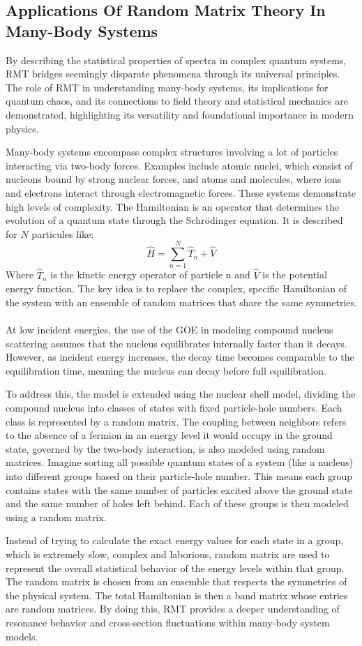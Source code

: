 \subsection{Applications Of Random Matrix Theory In Many-Body Systems}\label{subsec:applications-of-random-matrix-theory-in-many-body-systems}

By describing the statistical properties of spectra in complex quantum systems, RMT bridges seemingly disparate phenomena through its universal principles.
The role of RMT in understanding many-body systems, its implications for quantum chaos, and its connections to field theory and statistical mechanics are demonstrated, highlighting its versatility and foundational importance in modern physics.

Many-body systems encompass complex structures involving a lot of particles interacting via two-body forces.
Examples include atomic nuclei, which consist of nucleons bound by strong nuclear forces, and atoms and molecules, where ions and electrons interact through electromagnetic forces.
These systems demonstrate high levels of complexity.
The Hamiltonian is an operator that determines the evolution of a quantum state through the Schrödinger equation.
It is described for $N$ particules like:
\[\hat{H}=\sum^N_{n=1}\hat{T}_n+\hat{V}\]
Where $\hat{T}_n$ is the kinetic energy operator of particle n and $\hat{V}$ is the potential energy function.
The key idea is to replace the complex, specific Hamiltonian of the system with an ensemble of random matrices that share the same symmetries.
\\\\
At low incident energies, the use of the GOE in modeling compound nucleus scattering assumes that the nucleus equilibrates internally faster than it decays.
However, as incident energy increases, the decay time becomes comparable to the equilibration time, meaning the nucleus can decay before full equilibration.

\noindent To address this, the model is extended using the nuclear shell model, dividing the compound nucleus into classes of states with fixed particle-hole numbers.
Each class is represented by a random matrix.
The coupling between neighbors refers to the absence of a fermion in an energy level it would occupy in the ground state, governed by the two-body interaction, is also modeled using random matrices.
Imagine sorting all possible quantum states of a system (like a nucleus) into different groups based on their particle-hole number.
This means each group contains states with the same number of particles excited above the ground state and the same number of holes left behind.
Each of these groups is then modeled using a random matrix.

Instead of trying to calculate the exact energy values for each state in a group, which is extremely slow, complex and laborious, random matrix are used to represent the overall statistical behavior of the energy levels within that group.
The random matrix is chosen from an ensemble that respects the symmetries of the physical system.
The total Hamiltonian is then a band matrix whose entries are random matrices.
By doing this, RMT provides a deeper understanding of resonance behavior and cross-section fluctuations within many-body system models.
